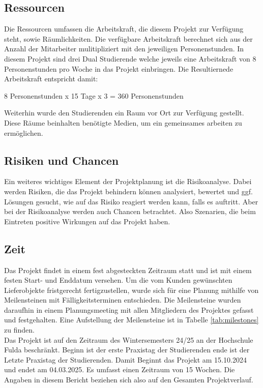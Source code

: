 \documentclass[12pt,oneside]{article}
\begin{document}
\subsection{Ressourcen}

Die Ressourcen umfassen die Arbeitskraft, die diesem Projekt zur Verfügung steht, sowie Räumlichkeiten. 
Die verfügbare Arbeitskraft berechnet sich aus der Anzahl der Mitarbeiter mulitipliziert mit den jeweiligen Personenstunden.
In diesem Projekt sind drei Dual Studierende welche jeweils eine Arbeitskraft von 8 Personenstunden pro Woche in das Projekt einbringen. 
Die Resultiernede Arbeitskraft entspricht damit:

		8 Personenstunden x 15 Tage x 3 = 360 Personenstunden

Weiterhin wurde den Studierenden ein Raum vor Ort zur Verfügung gestellt. Diese Räume beinhalten benötigte Medien, um ein gemeinsames arbeiten zu ermöglichen.

\subsection{Risiken und Chancen}
Ein weiteres wichtiges Element der Projektplanung ist die Risikoanalyse. Dabei werden Risiken, die das Projekt behindern können analysiert,
bewertet und ggf. Lösungen gesucht, wie auf das Risiko reagiert werden kann, falls es auftritt. 
Aber bei der Risikoanalyse werden auch Chancen betrachtet. Also Szenarien, die beim Eintreten positive Wirkungen auf das Projekt haben. 

\subsection{Zeit}
Das Projekt findet in einem fest abgesteckten Zeitraum statt und ist mit einem festen Start- und Enddatum versehen.
Um die vom Kunden gewünschten Lieferobjekte fristgerecht fertigzustellen, wurde sich für eine Planung mithilfe von Meilensteinen mit
Fälligkeitsterminen entschieden. Die Meilensteine wurden daraufhin in einem Planungsmeeting mit allen Mitgliedern des Projektes gefasst und festgehalten.
Eine Aufstellung der Meilensteine ist in Tabelle \ref{tab:milestones} zu finden.\\

Das Projekt ist auf den Zeitraum des Wintersemesters 24/25 an der Hochschule Fulda beschränkt.
Beginn ist der erste Praxistag der Studierenden ende ist der Letzte Praxistag der Studierenden. 
Damit Beginnt das Projekt am 15.10.2024 und endet am 04.03.2025. Es umfasst einen Zeitraum von 15 Wochen. 
Die Angaben in diesem Bericht beziehen sich also auf den Gesamten Projektverlauf.
\end{document}
